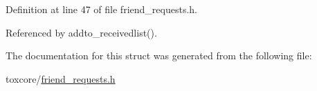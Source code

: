 Definition at line 47 of file friend\+\_\+requests.\+h.



Referenced by addto\+\_\+receivedlist().



The documentation for this struct was generated from the following file\+:\begin{DoxyCompactItemize}
\item 
toxcore/\hyperlink{friend__requests_8h}{friend\+\_\+requests.\+h}\end{DoxyCompactItemize}
